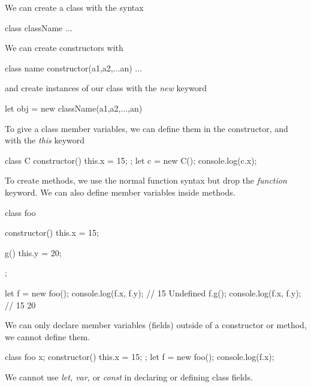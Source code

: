 \documentclass{report}
\begin{document}
    \pagebreak 
    \bigbreak \noindent 
    We can create a class with the syntax
    \bigbreak \noindent 
    \begin{jscode}
        class className {
            ...
        }
    \end{jscode}
    \bigbreak \noindent 
    We can create constructors with 
    \bigbreak \noindent 
    \begin{jscode}
        class name {
            constructor(a1,a2,...an) {
                ...
            }
        }
    \end{jscode}
    \bigbreak \noindent 
    and create instances of our class with the \textit{new} keyword
    \bigbreak \noindent 
    \begin{jscode}
    let obj = new className(a1,a2,...,an)
    \end{jscode}
    \bigbreak \noindent 
    To give a class member variables, we can define them in the constructor, and with the \textit{this} keyword
    \bigbreak \noindent 
    \begin{jscode}
        class C {
            constructor() {
                this.x = 15;
            }
        };
        let c = new C();
        console.log(c.x);
    \end{jscode}
    \bigbreak \noindent 
    To create methods, we use the normal function syntax but drop the \textit{function} keyword. We can also define member variables inside methods.
    \bigbreak \noindent 
    \begin{jscode}
        class foo {
            constructor() {
                this.x = 15;
            }

            g() {
                this.y = 20;
            }
        };

        let f = new foo();
        console.log(f.x, f.y); // 15 Undefined
        f.g();
        console.log(f.x, f.y); // 15 20
    \end{jscode}
    \bigbreak \noindent 
    We can only declare member variables (fields) outside of a constructor or method, we cannot define them.
    \bigbreak \noindent 
    \begin{jscode}
        class foo {
            x;
            constructor() {
                this.x = 15;
            }
        };
        let f = new foo();
        console.log(f.x);
    \end{jscode}
    \bigbreak \noindent 
    We cannot use \textit{let, var, } or \textit{const} in declaring or defining class fields.
\end{document}
